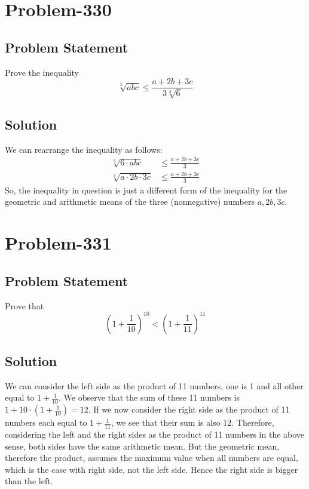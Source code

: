 \documentclass{article}
\begin{document}
\section*{Problem-330}
\subsection*{Problem Statement}
Prove the inequality
\[
	\sqrt[3]{abc} \leq \frac{a+2b+3c}{3\sqrt[3]{6}}
\]

\subsection*{Solution}
We can rearrange the inequality as follows:
\begin{equation*}
	\begin{aligned}
		\sqrt[3]{6 \cdot abc} &\leq \frac{a+2b+3c}{3}\\
		\sqrt[3]{a \cdot 2b \cdot 3c} &\leq \frac{a + 2b + 3c}{3}
	\end{aligned}
\end{equation*}
So, the inequality in question is just a different form of the inequality for the geometric and arithmetic means of the three (nonnegative) numbers $a, 2b, 3c$.

\section*{Problem-331}
\subsection*{Problem Statement}
Prove that
\[
	\left( 1 + \frac{1}{10} \right)^{10} < \left( 1 + \frac{1}{11} \right)^{11}
\]

\subsection*{Solution}
We can consider the left side as the product of 11 numbers, one is 1 and all other equal to $1 + \frac{1}{10}$. We observe that the sum of these 11 numbers is $1 + 10\cdot  \left( 1 + \frac{1}{10} \right) = 12$. If we now consider the right side as the product of 11 numbers each equal to $1 + \frac{1}{11}$, we see that their sum is also 12. Therefore, considering the left and the right sides as the product of 11 numbers in the above sense, both sides have the same arithmetic mean. But the geometric mean, therefore the product, assumes the maximum value when all numbers are equal, which is the case with right side, not the left side. Hence the right side is bigger than the left.
\end{document}
